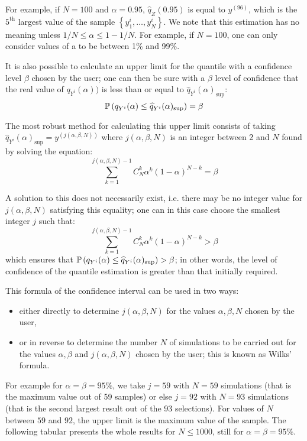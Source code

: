 {  For example, if  $N=100$ and  $\alpha = 0.95$, $\widehat{q}_Z(0.95)$  is equal to  $y^{(96)}$, which is the $5^\textrm{th}$ largest value of the sample $\left\{ y^i_1,\ldots,y^i_N \right\}$. We note that this estimation has no meaning unless $1/N \leq \alpha \leq 1-1/N$. For example, if $N=100$, one can only consider values of a to be between 1\% and 99\%. \vspace{2mm}

  It is also possible to calculate an upper limit for the quantile with a confidence level $\beta$ chosen by the user; one can then  be sure with a $\beta$ level of confidence that the real value of $q_{Y^i}(\alpha))$ is less than or equal to $\widehat{q}_{Y^i}(\alpha)_{\sup}$:
  $$
  {\mathbb P}\left( q_{Y^i}(\alpha) \leq \widehat{q}_{Y^i}(\alpha)_{\sup} \right) = \beta
  $$

  The most robust method for calculating this upper limit consists of taking $\widehat{q}_{Y^i}(\alpha)_{\sup} = y^{(j(\alpha,\beta,N))}$  where $j(\alpha,\beta,N)$ is an integer between 2 and $N$ found by solving the equation:
  $$
  \sum_{k=1}^{j(\alpha,\beta,N) - 1} C^k_N \alpha^k \left( 1-\alpha \right)^{N-k} = \beta
  $$

  A solution to this does not necessarily exist, i.e. there may be no integer value for $j(\alpha,\beta,N)$ satisfying this equality; one can in this case choose the smallest integer $j$ such that:
  $$
  \sum_{k=1}^{j(\alpha,\beta,N) - 1} C^k_N \alpha^k \left( 1-\alpha \right)^{N-k} > \beta
  $$
  which ensures that  ${\mathbb P}\left( q_{Y^i}(\alpha) \leq \widehat{q}_{Y^i}(\alpha)_{\sup} \right) > \beta$; in other words,  the level of confidence of the quantile estimation is greater than that initially required.

  This formula of the confidence interval can be used in two ways:
  \begin{itemize}
  \item either directly to determine $j(\alpha,\beta,N)$ for the values $\alpha,\beta,N$ chosen by the user,
  \item or in reverse to determine the number $N$ of simulations to be carried out for the values $\alpha,\beta$ and $j(\alpha,\beta,N)$ chosen by the user; this is known as Wilks' formula.
  \end{itemize}

  For example for  $\alpha = \beta = 95\%$, we take $j=59$ with  $N = 59$ simulations (that is the maximum value out of  59 samples) or else  $j = 92$ with $N = 93$ simulations (that is the second largest result out of the 93 selections). For values of $N$ between $59$ and $92$, the upper limit is the maximum value of the sample. The following tabular presents the whole results for $N \leq 1000$, still for $\alpha = \beta = 95\%$. \vspace{2mm}



}
